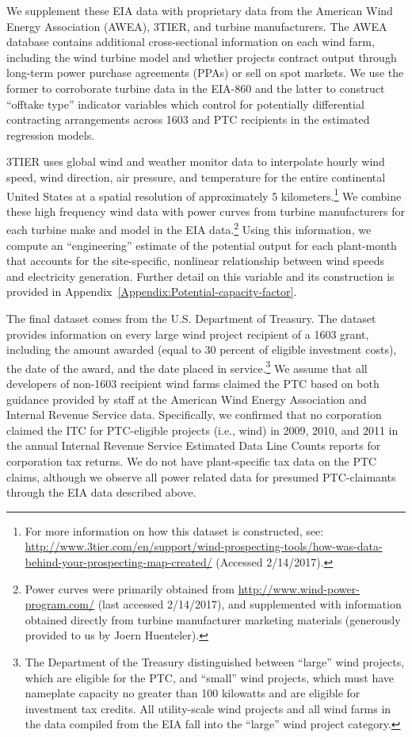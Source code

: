 \documentclass[12pt]{article}
\begin{document}
We supplement these EIA data with proprietary data from the American Wind Energy Association (AWEA), 3TIER, and turbine manufacturers. The AWEA database contains additional cross-sectional information on each wind farm, including the wind turbine model and whether projects contract output through long-term power purchase agreements (PPAs) or sell on spot markets. We use the former to corroborate turbine data in the EIA-860 and the latter to construct ``offtake type'' indicator variables which control for potentially differential contracting arrangements across 1603 and PTC recipients in the estimated regression models.

3TIER uses global wind and weather monitor data to interpolate hourly wind speed, wind direction, air pressure, and temperature for the entire continental United States at a spatial resolution of approximately 5 kilometers.\footnote{For more information on how this dataset is constructed, see: \href{http://www.3tier.com/en/support/wind-prospecting-tools/how-was-data-behind-your-prospecting-map-created/}{http://www.3tier.com/en/support/wind-prospecting-tools/how-was-data-behind-your-prospecting-map-created/} (Accessed 2/14/2017).} We combine these high frequency wind data with power curves from turbine manufacturers for each turbine make and model in the EIA data.\footnote{Power curves were primarily obtained from \href{http://www.wind-power-program.com/}{http://www.wind-power-program.com/} (last accessed 2/14/2017), and supplemented with information obtained directly from turbine manufacturer marketing materials (generously provided to us by Joern Huenteler).} Using this information, we compute an ``engineering'' estimate of the potential output for each plant-month that accounts for the site-specific, nonlinear relationship between wind speeds and electricity generation. Further detail on this variable and its construction is provided in Appendix~\ref{Appendix:Potential-capacity-factor}.

The final dataset comes from the U.S. Department of Treasury. The dataset provides information on every large wind project recipient of a 1603 grant, including the amount awarded (equal to 30 percent of eligible investment costs), the date of the award, and the date placed in service.\footnote{The Department of the Treasury distinguished between ``large'' wind projects, which are eligible for the PTC, and ``small'' wind projects, which must have nameplate capacity no greater than 100 kilowatts and are eligible for investment tax credits. All utility-scale wind projects and all wind farms in the data compiled from the EIA fall into the ``large'' wind project category. } We assume that all developers of non-1603 recipient wind farms claimed the PTC based on both guidance provided by staff at the American Wind Energy Association and Internal Revenue Service data. Specifically, we confirmed that no corporation claimed the ITC for PTC-eligible projects (i.e., wind) in 2009, 2010, and 2011 in the annual Internal Revenue Service Estimated Data Line Counts reports for corporation tax returns. We do not have plant-specific tax data on the PTC claims, although we observe all power related data for presumed PTC-claimants through the EIA data described above.
\end{document}
